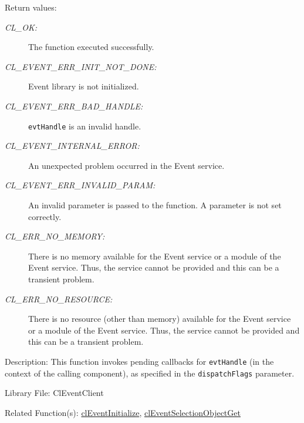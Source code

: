 \begin{flushleft}
\begin{Desc}
\begin{description}
\end{description}
\end{Desc}
\begin{Desc}
\item[Return values:]
\begin{description}
\item[{\em CL\_\-OK:}]The function executed successfully. 
\item[{\em CL\_\-EVENT\_\-ERR\_\-INIT\_\-NOT\_\-DONE:}]Event library is not initialized. 
\item[{\em CL\_\-EVENT\_\-ERR\_\-BAD\_\-HANDLE:}]{\tt{evtHandle}} is an invalid handle. 
\item[{\em CL\_\-EVENT\_\-INTERNAL\_\-ERROR:}]An unexpected problem occurred in the Event service. 
\item[{\em CL\_\-EVENT\_\-ERR\_\-INVALID\_\-PARAM:}]An invalid parameter is passed to the function. A parameter is not set correctly.
\item[{\em CL\_\-ERR\_\-NO\_\-MEMORY:}]There is no memory available for the Event service or a module of the Event service. Thus, the service cannot be
provided and this can be a transient problem.
\item[{\em CL\_\-ERR\_\-NO\_\-RESOURCE:}]There is no resource (other than memory) available for the Event service or a module of the Event service. Thus,
the service cannot be provided and this can be a transient problem.
\end{description}
\end{Desc}
\begin{Desc}
\item[Description:]
This function invokes pending callbacks for {\tt{evtHandle}} (in the context of the calling component), as specified in the {\tt{dispatchFlags}} 
parameter. 
\end{Desc}
\begin{Desc}
\item[Library File:]Cl\-Event\-Client\end{Desc}
\begin{Desc}
\item[Related Function(s):]\hyperlink{pageem101}{cl\-Event\-Initialize}, \hyperlink{pageem117}{cl\-Event\-Selection\-Object\-Get} \end{Desc}
\newpage



\end{flushleft}
